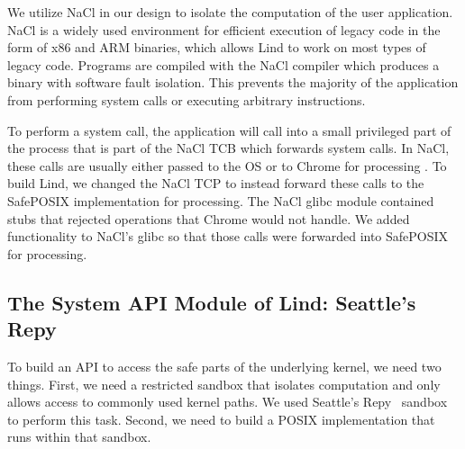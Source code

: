 We utilize NaCl in our design to isolate the computation of the user application.  NaCl is a widely used environment for efficient  execution of legacy code in the form of x86 and ARM binaries, which allows Lind to work on most types of legacy code. Programs are compiled with the NaCl compiler which produces a binary with software fault isolation. This prevents the majority of the application from performing system calls  or executing arbitrary instructions. 

To perform a system call, the application will call into a small privileged
part of the process that is part of the NaCl TCB which forwards system calls.
 In NaCl, these calls are usually either passed to the OS or to Chrome for 
processing .  To build Lind, we changed the NaCl TCP to 
instead forward these calls to the SafePOSIX implementation
for processing.  The NaCl glibc module contained stubs that rejected operations
that Chrome would not handle.  We added functionality to NaCl's glibc so that
those calls were forwarded into SafePOSIX for processing.


%

\subsection{The System API Module of Lind: Seattle's Repy}

To build an API to access the safe parts of the underlying kernel, we need 
two things.  First, we need a restricted sandbox that isolates computation
and only allows access to commonly used kernel paths.  We used 
Seattle's Repy~\cite{Repy-10} sandbox to perform this task.
Second, we need to build a POSIX implementation that runs within that sandbox.  

